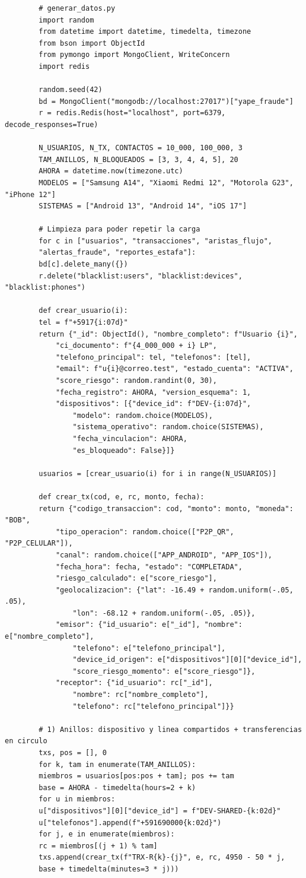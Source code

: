 \documentclass[11pt,a4paper]{article}
\begin{document}
	\begin{lstlisting}
		# generar_datos.py
		import random
		from datetime import datetime, timedelta, timezone
		from bson import ObjectId
		from pymongo import MongoClient, WriteConcern
		import redis
		
		random.seed(42)
		bd = MongoClient("mongodb://localhost:27017")["yape_fraude"]
		r = redis.Redis(host="localhost", port=6379, decode_responses=True)
		
		N_USUARIOS, N_TX, CONTACTOS = 10_000, 100_000, 3
		TAM_ANILLOS, N_BLOQUEADOS = [3, 3, 4, 4, 5], 20
		AHORA = datetime.now(timezone.utc)
		MODELOS = ["Samsung A14", "Xiaomi Redmi 12", "Motorola G23", "iPhone 12"]
		SISTEMAS = ["Android 13", "Android 14", "iOS 17"]
		
		# Limpieza para poder repetir la carga
		for c in ["usuarios", "transacciones", "aristas_flujo",
		"alertas_fraude", "reportes_estafa"]:
		bd[c].delete_many({})
		r.delete("blacklist:users", "blacklist:devices", "blacklist:phones")
		
		def crear_usuario(i):
		tel = f"+5917{i:07d}"
		return {"_id": ObjectId(), "nombre_completo": f"Usuario {i}",
			"ci_documento": f"{4_000_000 + i} LP",
			"telefono_principal": tel, "telefonos": [tel],
			"email": f"u{i}@correo.test", "estado_cuenta": "ACTIVA",
			"score_riesgo": random.randint(0, 30),
			"fecha_registro": AHORA, "version_esquema": 1,
			"dispositivos": [{"device_id": f"DEV-{i:07d}",
				"modelo": random.choice(MODELOS),
				"sistema_operativo": random.choice(SISTEMAS),
				"fecha_vinculacion": AHORA,
				"es_bloqueado": False}]}
		
		usuarios = [crear_usuario(i) for i in range(N_USUARIOS)]
		
		def crear_tx(cod, e, rc, monto, fecha):
		return {"codigo_transaccion": cod, "monto": monto, "moneda": "BOB",
			"tipo_operacion": random.choice(["P2P_QR", "P2P_CELULAR"]),
			"canal": random.choice(["APP_ANDROID", "APP_IOS"]),
			"fecha_hora": fecha, "estado": "COMPLETADA",
			"riesgo_calculado": e["score_riesgo"],
			"geolocalizacion": {"lat": -16.49 + random.uniform(-.05, .05),
				"lon": -68.12 + random.uniform(-.05, .05)},
			"emisor": {"id_usuario": e["_id"], "nombre": e["nombre_completo"],
				"telefono": e["telefono_principal"],
				"device_id_origen": e["dispositivos"][0]["device_id"],
				"score_riesgo_momento": e["score_riesgo"]},
			"receptor": {"id_usuario": rc["_id"],
				"nombre": rc["nombre_completo"],
				"telefono": rc["telefono_principal"]}}
		
		# 1) Anillos: dispositivo y linea compartidos + transferencias en circulo
		txs, pos = [], 0
		for k, tam in enumerate(TAM_ANILLOS):
		miembros = usuarios[pos:pos + tam]; pos += tam
		base = AHORA - timedelta(hours=2 + k)
		for u in miembros:
		u["dispositivos"][0]["device_id"] = f"DEV-SHARED-{k:02d}"
		u["telefonos"].append(f"+591690000{k:02d}")
		for j, e in enumerate(miembros):
		rc = miembros[(j + 1) % tam]
		txs.append(crear_tx(f"TRX-R{k}-{j}", e, rc, 4950 - 50 * j,
		base + timedelta(minutes=3 * j)))
		

\end{lstlisting}
\end{document}
